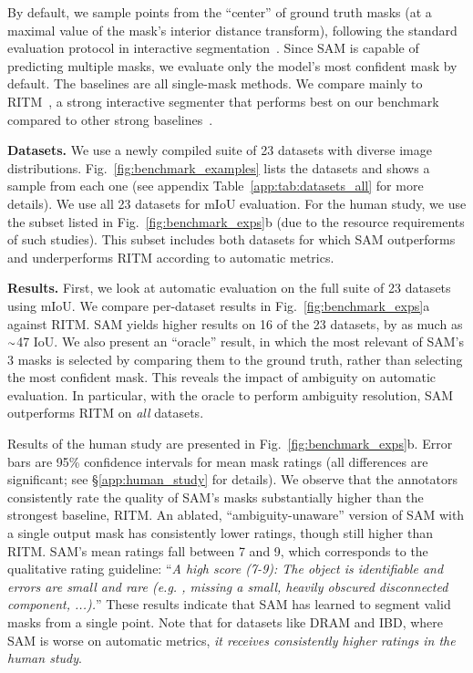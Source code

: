 By default, we sample points from the ``center'' of ground truth masks (at a maximal value of the mask's interior distance transform), following the standard evaluation protocol in interactive segmentation~\cite{sofiiuk2022reviving}. Since SAM is capable of predicting multiple masks, we evaluate only the model's most confident mask by default. The baselines are all single-mask methods. We compare mainly to RITM~\cite{sofiiuk2022reviving}, a strong interactive segmenter that performs best on our benchmark compared to other strong baselines~\cite{liu2022simpleclick,chen2022focalclick}.

\textbf{Datasets.} We use a newly compiled suite of 23 datasets with diverse image distributions. Fig.~\ref{fig:benchmark_examples} lists the datasets and shows a sample from each one (see appendix Table~\ref{app:tab:datasets_all} for more details). We use all 23 datasets for mIoU evaluation. For the human study, we use the subset listed in Fig.~\ref{fig:benchmark_exps}{\color{linkcolor}b} (due to the resource requirements of such studies). This subset includes both datasets for which SAM outperforms and underperforms RITM according to automatic metrics.

\textbf{Results.} First, we look at automatic evaluation on the full suite of 23 datasets using mIoU. We compare per-dataset results in Fig.~\ref{fig:benchmark_exps}{\color{linkcolor}a} against RITM. SAM yields higher results on 16 of the 23 datasets, by as much as $\raise.17ex\hbox{$\scriptstyle\sim$}$47 IoU. We also present an ``oracle'' result, in which the most relevant of SAM's 3 masks is selected by comparing them to the ground truth, rather than selecting the most confident mask. This reveals the impact of ambiguity on automatic evaluation. In particular, with the oracle to perform ambiguity resolution, SAM outperforms RITM on \emph{all} datasets.

Results of the human study are presented in Fig.~\ref{fig:benchmark_exps}{\color{linkcolor}b}. Error bars are 95\% confidence intervals for mean mask ratings (all differences are significant; see \S\ref{app:human_study} for details). We observe that the annotators consistently rate the quality of SAM's masks substantially higher than the strongest baseline, RITM. An ablated, ``ambiguity-unaware'' version of SAM with a single output mask has consistently lower ratings, though still higher than RITM. SAM's mean ratings fall between 7 and 9, which corresponds to the qualitative rating guideline: ``\emph{A high score (7-9): The object is identifiable and errors are small and rare (e.g. , missing a small, heavily obscured disconnected component, ...).}'' These results indicate that SAM has learned to segment valid masks from a single point. Note that for datasets like DRAM and IBD, where SAM is worse on automatic metrics, \emph{it receives consistently higher ratings in the human study}.


